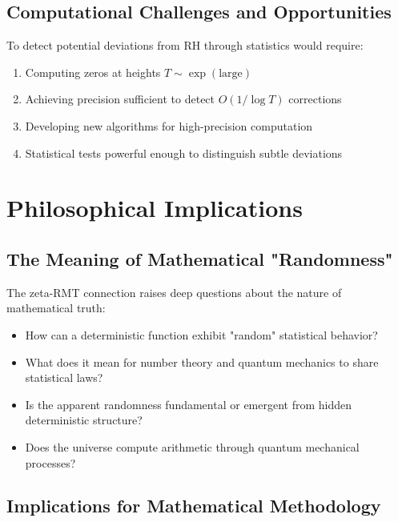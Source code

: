 \subsection{Computational Challenges and Opportunities}

\begin{openproblem}
To detect potential deviations from RH through statistics would require:
\begin{enumerate}
\item Computing zeros at heights $T \sim \exp(\text{large})$
\item Achieving precision sufficient to detect $O(1/\log T)$ corrections
\item Developing new algorithms for high-precision computation
\item Statistical tests powerful enough to distinguish subtle deviations
\end{enumerate}
\end{openproblem}

\section{Philosophical Implications}
\label{sec:philosophical}

\subsection{The Meaning of Mathematical "Randomness"}

\begin{philosophicalreflection}
The zeta-RMT connection raises deep questions about the nature of mathematical truth:
\begin{itemize}
\item How can a deterministic function exhibit "random" statistical behavior?
\item What does it mean for number theory and quantum mechanics to share statistical laws?
\item Is the apparent randomness fundamental or emergent from hidden deterministic structure?
\item Does the universe compute arithmetic through quantum mechanical processes?
\end{itemize}
\end{philosophicalreflection}

\subsection{Implications for Mathematical Methodology}

